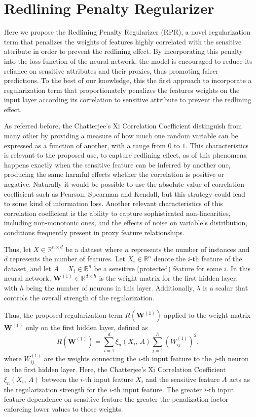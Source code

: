 \section{Redlining Penalty Regularizer}

Here we propose the Redlining Penalty Regularizer (RPR), a novel regularization term that penalizes the weights of features highly correlated with the sensitive attribute in order to prevent the redlining effect. By incorporating this penalty into the loss function of the neural network, the model is encouraged to reduce its reliance on sensitive attributes and their proxies, thus promoting fairer predictions. To the best of our knowledge, this the first approach to incorporate a regularization term that proportionately penalizes the features weights on the input layer according its correlation to sensitive attribute to prevent the redlining effect.

As referred before, the Chatterjee's Xi Correlation Coefficient distinguish from many other by providing a measure of how much one random variable can be expressed as a function of another, with a range from $0$ to $1$. This characteristics is relevant to the proposed use, to capture redlining effect, as of this phenomena happens exactly when the sensitive feature can be inferred by another one, producing the same harmful effects whether the correlation is positive or negative. Naturally it would be possible to use the absolute value of correlation coefficient such as Pearson, Spearman and Kendall, but this strategy could lead to some kind of information loss. Another relevant characteristics of this correlation coefficient is the ability to capture sophisticated non-linearities, including non-monotonic ones, and the effects of noise on variable's distribution, conditions frequently present in proxy feature relationships. 

Thus, let $X \in \mathbb{R}^{n \times d}$ be a dataset where $n$ represents the number of instances and $d$ represents the number of features. Let $X_i \in \mathbb{R}^n$ denote the $i$-th feature of the dataset, and let $A = X_i \in \mathbb{R}^n$ be a sensitive (protected) feature for some $i$. In this neural network, $\mathbf{W}^{(1)} \in \mathbb{R}^{d \times h}$ is the weight matrix for the first hidden layer, with $h$ being the number of neurons in this layer. Additionally, $\lambda$ is a scalar that controls the overall strength of the regularization.

Thus, the proposed regularization term $R(\mathbf{W}^{(1)})$ applied to the weight matrix $\mathbf{W}^{(1)}$ only on the first hidden layer, defined as 
\begin{equation}\label{eq:xi_reg}
R(\mathbf{W}^{(1)}) = \sum_{i=1}^d \xi_n(X_i,\,A) \sum_{j=1}^h (W^{(1)}_{ij})^2,
\end{equation}
where $W^{(1)}_{ij}$ are the weights connecting the $i$-th input feature to the $j$-th neuron in the first hidden layer. Here, the Chatterjee's Xi Correlation Coefficient $\xi_n(X_i,\,A)$ between the $i$-th input feature $X_i$ and the sensitive feature $A$ acts as the regularization strength for the $i$-th input feature. The greater $i$-th input feature dependence on sensitive feature the greater the penalization factor enforcing lower values to those weights.

